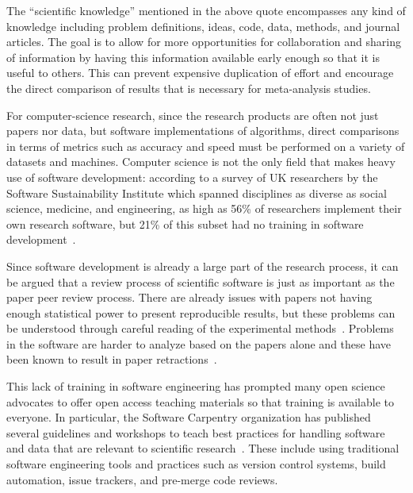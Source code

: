 The ``scientific knowledge'' mentioned in the above quote
encompasses any kind of knowledge including problem definitions,
ideas, code, data, methods, and journal articles. The goal is
to allow for more opportunities for collaboration and sharing of
information by having this information available early enough so
that it is useful to others. This can prevent expensive
duplication of effort and encourage the direct comparison of
results that is necessary for meta-analysis studies.

For computer-science research, since the research
products are often not just papers nor data, but software
implementations of algorithms, direct comparisons in terms of
metrics such as accuracy and speed must be performed on a variety of
datasets and machines. Computer science is not the only field that
makes heavy use of software development:
according to a survey of UK researchers by the Software
Sustainability Institute which spanned disciplines as diverse as
social science, medicine, and engineering, as high as 56\% of
researchers implement their own research software, but 21\% of
this subset had no training in software
development~\autocite{SSI:hettrick_2014_14809}.

Since software development is already a large part of the research
process, it can be argued that a review process of scientific
software is just as important as the paper peer review process.
There are already issues with papers not having enough statistical power
to present reproducible results, but these problems can be
understood through careful reading of the experimental
methods~\autocite{Ioannidis2005,Button2013}. Problems in the software
are harder to analyze based on the papers alone and these have
been known to result in paper retractions~\autocite{Miller2006,Merali2010,Joppa2013}.

This lack of training in software engineering has prompted many
open science advocates to offer open access teaching
materials so that training is available to everyone.
In particular, the Software Carpentry organization has
published several guidelines and workshops to teach best
practices for handling software and data that are relevant to
scientific research~\autocite{Wilson2006,Wilson2014}. These
include using traditional software engineering tools and practices
such as version control systems, build automation, issue
trackers, and pre-merge code reviews.

